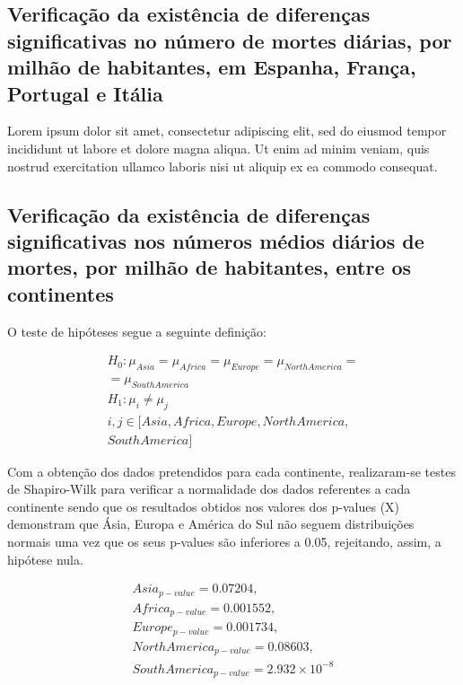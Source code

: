 \documentclass[conference]{IEEEtran}
\begin{document}
\subsection{Verificação da existência de diferenças significativas no número de mortes diárias, por milhão de habitantes, em Espanha, França, Portugal e Itália}
Lorem ipsum dolor sit amet, consectetur adipiscing elit, sed do eiusmod tempor incididunt ut labore et dolore magna aliqua. Ut enim ad minim veniam, quis nostrud exercitation ullamco laboris nisi ut aliquip ex ea commodo consequat.

\subsection{Verificação da existência de diferenças significativas nos números médios diários de mortes, por milhão de habitantes, entre os continentes}

O teste de hipóteses segue a seguinte definição:

\begin{equation}
  \begin{array}{l}
    H_{0}:\mu _{Asia}=\mu _{Africa}=\mu _{Europe}=\mu _{North America}= \\
    = \mu _{South America} \\ 
    H_{1}:\mu _{i}\neq \mu _{j} \\
    i,j\in [Asia, Africa, Europe, North America, \\
    South America]
  \end{array}
\end{equation}

Com a obtenção dos dados pretendidos para cada continente, realizaram-se testes de Shapiro-Wilk para verificar a normalidade dos dados referentes a cada continente sendo que os resultados obtidos nos valores dos p-values (X) demonstram que Ásia, Europa e América do Sul não seguem distribuições normais uma vez que os seus p-values são inferiores a 0.05, rejeitando, assim, a hipótese nula.

\begin{equation}
	\begin{array}{l}
	Asia_{p-value}=0.07204, \\
	Africa_{p-value}=0.001552, \\
	Europe_{p-value}=0.001734, \\
	North America_{p-value}=0.08603, \\
	South America_{p-value}=2.932\times 10^{-8}
	\end{array}
\end{equation}
\end{document}
